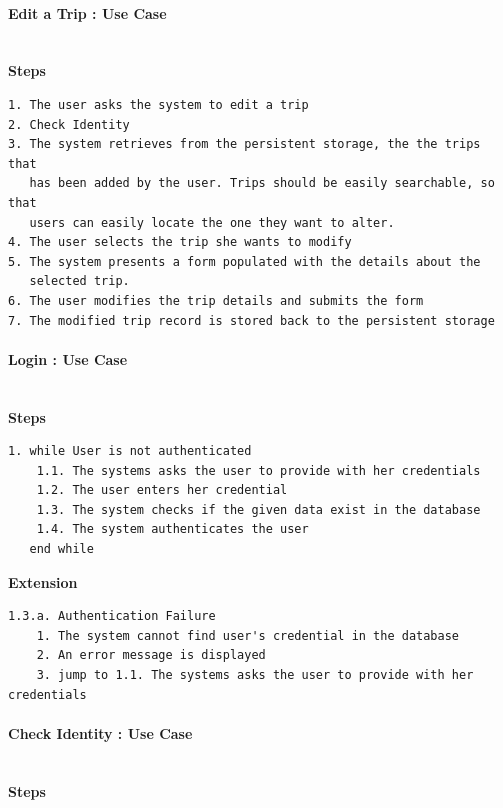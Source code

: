 \paragraph{Edit a Trip : Use Case}

\mbox{}\\
\newline
\textcolor[rgb]{0.00,0.00,1.00}{\textbf{Steps}}

\begin{verbatim}
1. The user asks the system to edit a trip
2. Check Identity
3. The system retrieves from the persistent storage, the the trips that
   has been added by the user. Trips should be easily searchable, so that
   users can easily locate the one they want to alter.
4. The user selects the trip she wants to modify
5. The system presents a form populated with the details about the
   selected trip.
6. The user modifies the trip details and submits the form
7. The modified trip record is stored back to the persistent storage
\end{verbatim}

\paragraph{Login : Use Case}

\mbox{}\\
\newline
\textcolor[rgb]{0.00,0.00,1.00}{\textbf{Steps}}

\begin{verbatim}
1. while User is not authenticated
    1.1. The systems asks the user to provide with her credentials
    1.2. The user enters her credential
    1.3. The system checks if the given data exist in the database
    1.4. The system authenticates the user
   end while
\end{verbatim}

\textcolor[rgb]{0.00,0.00,1.00}{\textbf{Extension}}
\begin{verbatim}
1.3.a. Authentication Failure
    1. The system cannot find user's credential in the database
    2. An error message is displayed
    3. jump to 1.1. The systems asks the user to provide with her credentials
\end{verbatim}

\paragraph{Check Identity : Use Case}

\mbox{}\\
\newline
\textcolor[rgb]{0.00,0.00,1.00}{\textbf{Steps}}

